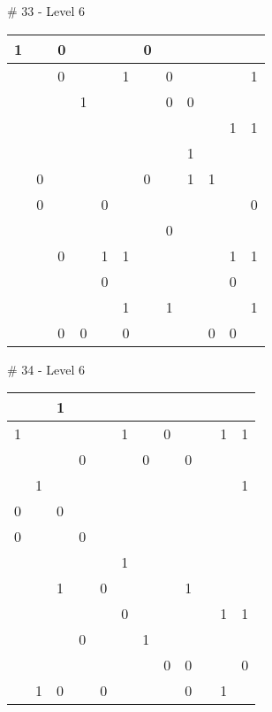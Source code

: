 \# 33 - Level 6 \newline
\begin{tabular}{|m{\collen}|m{\collen}|m{\collen}|m{\collen}|m{\collen}|m{\collen}|m{\collen}|m{\collen}|m{\collen}|m{\collen}|m{\collen}|m{\collen}|}
\hline
  1 &   & 0 &   &   &   & 0 &   &   &   &   &   \\
\hline
    &   & 0 &   &   & 1 &   & 0 &   &   &   & 1 \\
\hline
    &   &   & 1 &   &   &   & 0 & 0 &   &   &   \\
\hline
    &   &   &   &   &   &   &   &   &   & 1 & 1 \\
\hline
    &   &   &   &   &   &   &   & 1 &   &   &   \\
\hline
    & 0 &   &   &   &   & 0 &   & 1 & 1 &   &   \\
\hline
    & 0 &   &   & 0 &   &   &   &   &   &   & 0 \\
\hline
    &   &   &   &   &   &   & 0 &   &   &   &   \\
\hline
    &   & 0 &   & 1 & 1 &   &   &   &   & 1 & 1 \\
\hline
    &   &   &   & 0 &   &   &   &   &   & 0 &   \\
\hline
    &   &   &   &   & 1 &   & 1 &   &   &   & 1 \\
\hline
    &   & 0 & 0 &   & 0 &   &   &   & 0 & 0 &   \\
\hline
\end{tabular}


\medskip

\# 34 - Level 6 \newline
\begin{tabular}{|m{\collen}|m{\collen}|m{\collen}|m{\collen}|m{\collen}|m{\collen}|m{\collen}|m{\collen}|m{\collen}|m{\collen}|m{\collen}|m{\collen}|}
\hline
    &   & 1 &   &   &   &   &   &   &   &   &   \\
\hline
  1 &   &   &   &   & 1 &   & 0 &   &   & 1 & 1 \\
\hline
    &   &   & 0 &   &   & 0 &   & 0 &   &   &   \\
\hline
    & 1 &   &   &   &   &   &   &   &   &   & 1 \\
\hline
  0 &   & 0 &   &   &   &   &   &   &   &   &   \\
\hline
  0 &   &   & 0 &   &   &   &   &   &   &   &   \\
\hline
    &   &   &   &   & 1 &   &   &   &   &   &   \\
\hline
    &   & 1 &   & 0 &   &   &   & 1 &   &   &   \\
\hline
    &   &   &   &   & 0 &   &   &   &   & 1 & 1 \\
\hline
    &   &   & 0 &   &   & 1 &   &   &   &   &   \\
\hline
    &   &   &   &   &   &   & 0 & 0 &   &   & 0 \\
\hline
    & 1 & 0 &   & 0 &   &   &   & 0 &   & 1 &   \\
\hline
\end{tabular}


